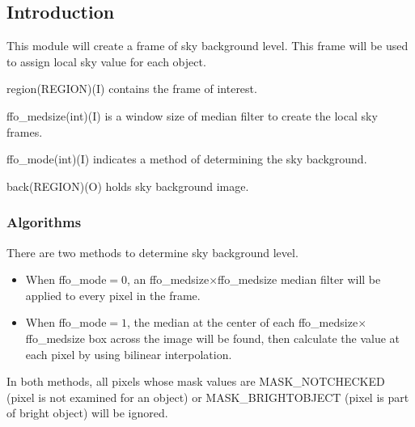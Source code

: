 \subsection{Introduction}

This module will create a frame of sky background level. This frame
will be used to assign local sky value for each object.

\begin{arguments}
\item{\quad region}(REGION)(I) contains the frame of interest.
\item{\quad ffo\_medsize}(int)(I) is a window size of median filter to
create the local sky frames.
\item{\quad ffo\_mode}(int)(I) indicates a method of determining the
sky background.
\item{\quad back}(REGION)(O) holds sky background image.
\end{arguments}

\subsubsection{Algorithms}

There are two methods to determine sky background level. 

\begin{itemize}
\item When ffo\_mode$=0$, an ffo\_medsize$\times$ffo\_medsize median
filter will be applied to every pixel in the frame. 
\item When ffo\_mode$=1$, the median at the center of each 
ffo\_medsize$\times$ffo\_medsize box across the image will be found, 
then calculate the value at each pixel by using bilinear interpolation.
\end{itemize}

In both methods, all pixels whose mask values are MASK\_NOTCHECKED
(pixel is not examined for an object) or MASK\_BRIGHTOBJECT (pixel is
part of bright object) will be ignored. 

